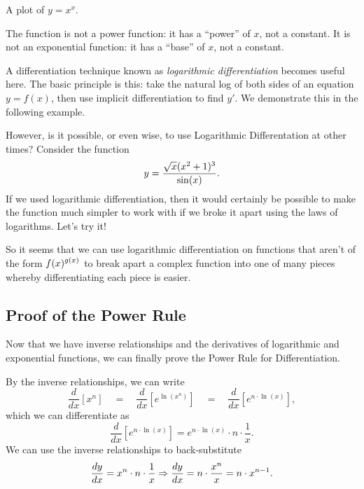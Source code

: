 \begin{marginfigure}[2cm] %
\caption{A plot of $y=x^x$.} \label{fig:logdiffa}
\end{marginfigure}

The function is not a power function: it has a ``power'' of $x$, not a constant. It is not an exponential function: it has a ``base'' of $x$, not a constant. 

A differentiation technique known as \emph{logarithmic differentiation} becomes useful here. The basic principle is this: take the natural log of both sides of an equation $y=f(x)$, then use implicit differentiation to find $y'$. We demonstrate this in the following example.


However, is it possible, or even wise, to use Logarithmic Differentation at other times? Consider the function
\[ \displaystyle y = \frac{\sqrt{x}(x^2 + 1)^3}{\sin(x)}. \] 
If we used logarithmic differentiation, then it would certainly be possible to make the function much simpler to work with if we broke it apart using the laws of logarithms.  Let's try it!


So it seems that we can use logarithmic differentiation on functions that aren't of the form $\displaystyle f(x)^{g(x)}$ to break apart a complex function into one of many pieces whereby differentiating each piece is easier.

\subsection{Proof of the Power Rule}

Now that we have inverse relationships and the derivatives of logarithmic and exponential functions, we can finally prove the Power Rule for Differentiation.


\proof By the inverse relationships, we can write
\[ \frac{d}{dx}[x^n] \quad = \quad \frac{d}{dx}\left[e^{\ln(x^n)}\right] \quad = \quad \frac{d}{dx}\left[e^{n \cdot \ln(x)}\right], \] 
which we can differentiate as
\[ \frac{d}{dx}\left[e^{n \cdot \ln(x)}\right]  = e^{n \cdot \ln(x)} \cdot n \cdot \frac{1}{x}. \] 
We can use the inverse relationships to back-substitute
\[ \displaystyle \frac{dy}{dx} = x^n \cdot n \cdot \frac{1}{x} \Rightarrow \frac{dy}{dx} = n \cdot \frac{x^n}{x} = n \cdot x^{n-1}. \]

